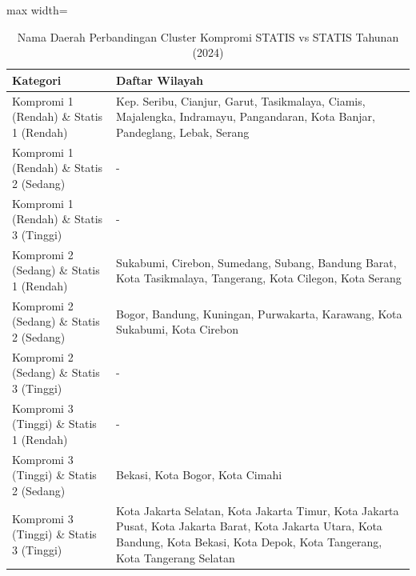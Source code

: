 \begin{table}[H]
\centering
\caption{Nama Daerah Perbandingan Cluster Kompromi STATIS vs STATIS Tahunan (2024)} \label{tab:app1comp_statis_name_2024}
\begin{adjustbox}{max width=\textwidth}
\begin{tabular}{|p{4cm}|p{10cm}|}
\hline
\textbf{Kategori} & \textbf{Daftar Wilayah} \\
\hline
Kompromi 1 (Rendah) \& Statis 1 (Rendah) & Kep. Seribu, Cianjur, Garut, Tasikmalaya, Ciamis, Majalengka, Indramayu, Pangandaran, Kota Banjar, Pandeglang, Lebak, Serang \\
\hline
Kompromi 1 (Rendah) \& Statis 2 (Sedang) & - \\
\hline
Kompromi 1 (Rendah) \& Statis 3 (Tinggi) & - \\
\hline
Kompromi 2 (Sedang) \& Statis 1 (Rendah) & Sukabumi, Cirebon, Sumedang, Subang, Bandung Barat, Kota Tasikmalaya, Tangerang, Kota Cilegon, Kota Serang \\
\hline
Kompromi 2 (Sedang) \& Statis 2 (Sedang) & Bogor, Bandung, Kuningan, Purwakarta, Karawang, Kota Sukabumi, Kota Cirebon \\
\hline
Kompromi 2 (Sedang) \& Statis 3 (Tinggi) & - \\
\hline
Kompromi 3 (Tinggi) \& Statis 1 (Rendah) & - \\
\hline
Kompromi 3 (Tinggi) \& Statis 2 (Sedang) & Bekasi, Kota Bogor, Kota Cimahi \\
\hline
Kompromi 3 (Tinggi) \& Statis 3 (Tinggi) & Kota Jakarta Selatan, Kota Jakarta Timur, Kota Jakarta Pusat, Kota Jakarta Barat, Kota Jakarta Utara, Kota Bandung, Kota Bekasi, Kota Depok, Kota Tangerang, Kota Tangerang Selatan \\
\hline
\end{tabular}
\end{adjustbox}
\end{table}